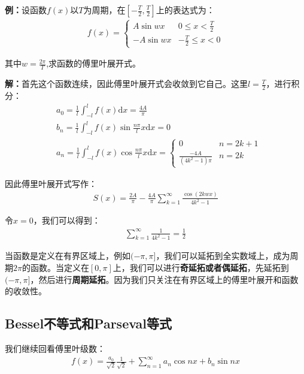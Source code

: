 \documentclass{ctexart}
\let\oldtextbf\textbf
\renewcommand{\textbf}[1]{\textcolor{brown!50!red}{\oldtextbf{#1}}}
\begin{document}
\textbf{\color{brown!50!red}例：}设函数$f(x)$以$T$为周期，在$[-\frac{T}{2},\frac{T}{2}]$上的表达式为：
\begin{align*}
    f(x)=\begin{cases}
        A\sin wx & 0\leq x <\frac{T}{2}\\
        -A\sin wx & -\frac{T}{2}\leq x<0
    \end{cases}
\end{align*}

其中$w=\frac{2\pi}{T}$,求函数的傅里叶展开式。

\textbf{\color{brown!50!red}解：}首先这个函数连续，因此傅里叶展开式会收敛到它自己。这里$l=\frac{T}{2}$，进行积分：
\begin{align*}
&a_0=\frac{1}{l}\int_{-l}^l f(x)\mathrm{d}x=\frac{4A}{\pi}\\
&b_n=\frac{1}{l}\int_{-l}^l f(x)\sin \frac{n\pi}{l}x\mathrm{d}x=0\\
&a_n=\frac{1}{l}\int_{-l}^l f(x)\cos \frac{n\pi}{l}x\mathrm{d}x=\begin{cases}
0 & n=2k+1\\
\frac{-4A}{(4k^2-1)\pi} &n=2k 
\end{cases}
\end{align*}

因此傅里叶展开式写作：
\begin{align*}
    S(x)=\frac{2A}{\pi}-\frac{4A}{\pi}\sum_{k=1}^\infty\frac{\cos (2kwx)}{4k^2-1}
\end{align*}
\begin{tcolorbox}[
    colback=bac1,     %
    colframe=fra1,   %
    coltitle=white!80,    
    coltext=tex1,%
    title=做一些延伸,
    fonttitle=\bfseries,        %
arc=2mm,                     %
breakable
]
令$x=0$，我们可以得到：
\begin{align*}
    \sum_{k=1}^\infty\frac{1}{4k^2-1}=\frac{1}{2}
\end{align*}
\end{tcolorbox}

当函数是定义在有界区域上，例如$(-\pi,\pi]$，我们可以延拓到全实数域上，成为周期$2\pi$的函数。当定义在$[0,\pi]$上，我们可以进行\textbf{\color{brown!50!red}奇延拓或者偶延拓}，先延拓到$(-\pi,\pi]$，然后进行\textbf{\color{brown!50!red}周期延拓}。因为我们只关注在有界区域上的傅里叶展开和函数的收敛性。

\subsection{Bessel不等式和Parseval等式}
我们继续回看傅里叶级数：
\begin{align*}
    f(x)=\frac{a_0}{\sqrt{2}}\frac{1}{\sqrt{2}}+\sum_{n=1}^\infty a_n\cos nx+b_n\sin nx
\end{align*}
\end{document}
